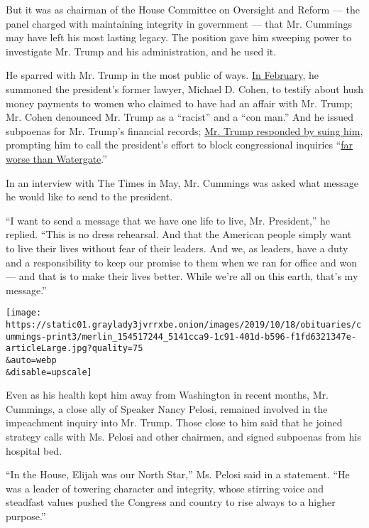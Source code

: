 But it was as chairman of the House Committee on Oversight and Reform
--- the panel charged with maintaining integrity in government --- that
Mr. Cummings may have left his most lasting legacy. The position gave
him sweeping power to investigate Mr. Trump and his administration, and
he used it.

He sparred with Mr. Trump in the most public of ways.
\href{https://www.nytimes3xbfgragh.onion/2019/02/26/us/politics/michael-cohen-trump-congress.html}{In
February}, he summoned the president's former lawyer, Michael D. Cohen,
to testify about hush money payments to women who claimed to have had an
affair with Mr. Trump; Mr. Cohen denounced Mr. Trump as a ``racist'' and
a ``con man.'' And he issued subpoenas for Mr. Trump's financial
records;
\href{https://www.nytimes3xbfgragh.onion/2019/04/22/us/politics/trump-sues-congress.html}{Mr.
Trump responded by suing him}, prompting him to call the president's
effort to block congressional inquiries
``\href{https://www.nytimes3xbfgragh.onion/2019/05/08/us/politics/elijah-cummings-trump-impeachment.html}{far
worse than Watergate}.''

In an interview with The Times in May, Mr. Cummings was asked what
message he would like to send to the president.

``I want to send a message that we have one life to live, Mr.
President,'' he replied. ``This is no dress rehearsal. And that the
American people simply want to live their lives without fear of their
leaders. And we, as leaders, have a duty and a responsibility to keep
our promise to them when we ran for office and won --- and that is to
make their lives better. While we're all on this earth, that's my
message.''

\texttt{[image: https://static01.graylady3jvrrxbe.onion/images/2019/10/18/obituaries/cummings-print3/merlin\_154517244\_5141cca9-1c91-401d-b596-f1fd6321347e-articleLarge.jpg?quality=75\\\&auto=webp\\\&disable=upscale]}

Even as his health kept him away from Washington in recent months, Mr.
Cummings, a close ally of Speaker Nancy Pelosi, remained involved in the
impeachment inquiry into Mr. Trump. Those close to him said that he
joined strategy calls with Ms. Pelosi and other chairmen, and signed
subpoenas from his hospital bed.

``In the House, Elijah was our North Star,'' Ms. Pelosi said in a
statement. ``He was a leader of towering character and integrity, whose
stirring voice and steadfast values pushed the Congress and country to
rise always to a higher purpose.''

